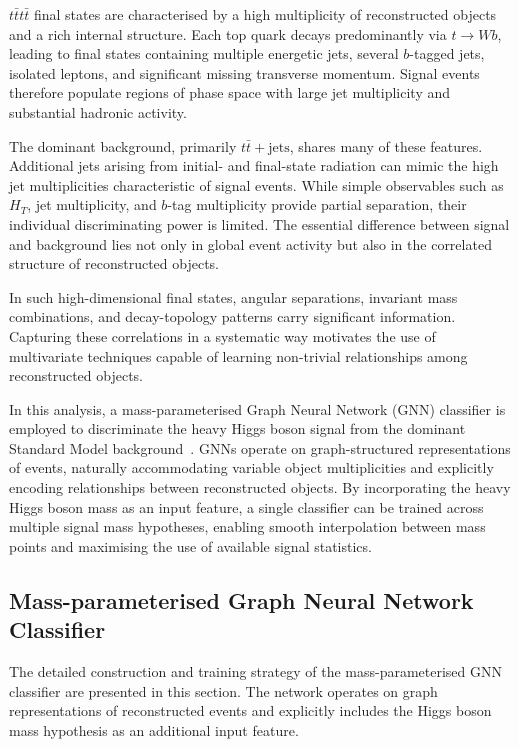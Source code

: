 ﻿$t\bar{t}t\bar{t}$ final states are characterised by a high multiplicity of reconstructed objects and a rich internal structure. 
Each top quark decays predominantly via $t \to Wb$, leading to final states containing multiple energetic jets, several $b$-tagged jets, isolated leptons, and significant missing transverse momentum. 
Signal events therefore populate regions of phase space with large jet multiplicity and substantial hadronic activity.

The dominant background, primarily $t\bar{t}+\mathrm{jets}$, shares many of these features. 
Additional jets arising from initial- and final-state radiation can mimic the high jet multiplicities characteristic of signal events. 
While simple observables such as $H_T$, jet multiplicity, and $b$-tag multiplicity provide partial separation, their individual discriminating power is limited. 
The essential difference between signal and background lies not only in global event activity but also in the correlated structure of reconstructed objects.

In such high-dimensional final states, angular separations, invariant mass combinations, and decay-topology patterns carry significant information. 
Capturing these correlations in a systematic way motivates the use of multivariate techniques capable of learning non-trivial relationships among reconstructed objects.

In this analysis, a mass-parameterised Graph Neural Network (GNN) classifier is employed to discriminate the heavy Higgs boson signal from the dominant Standard Model background~\cite{Fey2019PyTorchGeometric}. 
GNNs operate on graph-structured representations of events, naturally accommodating variable object multiplicities and explicitly encoding relationships between reconstructed objects. 
By incorporating the heavy Higgs boson mass as an input feature, a single classifier can be trained across multiple signal mass hypotheses, enabling smooth interpolation between mass points and maximising the use of available signal statistics.

\subsection{Mass-parameterised Graph Neural Network Classifier}

The detailed construction and training strategy of the mass-parameterised GNN classifier are presented in this section. 
The network operates on graph representations of reconstructed events and explicitly includes the Higgs boson mass hypothesis as an additional input feature.

